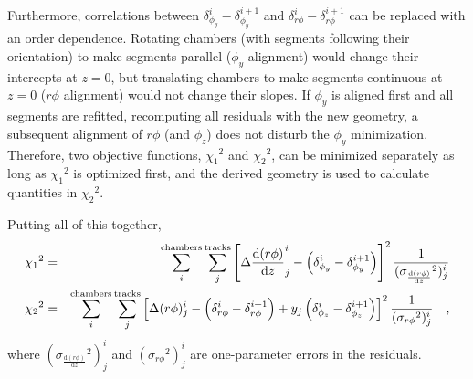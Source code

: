 Furthermore, correlations between $\delta_{\phi_y}^i
- \delta_{\phi_y}^{i+1}$ and $\delta_{r\phi}^i - \delta_{r\phi}^{i+1}$
can be replaced with an order dependence.  Rotating chambers (with
segments following their orientation) to make segments parallel
($\phi_y$ alignment) would change their intercepts at $z=0$,
but translating chambers to make segments continuous at $z=0$ ($r\phi$
alignment) would not change their slopes.  If
$\phi_y$ is aligned first and all segments are refitted, recomputing all residuals
with the new geometry, a subsequent alignment of $r\phi$ (and $\phi_z$) does not disturb
the $\phi_y$ minimization.  Therefore, two objective
functions, ${\chi_1}^2$ and ${\chi_2}^2$, can be minimized separately as long as
${\chi_1}^2$ is optimized first, and the derived geometry is used to calculate quantities in ${\chi_2}^2$.

Putting all of this together, 
\begin{eqnarray}
{\chi_1}^2 &=& \sum_i^{\mbox{\scriptsize chambers}} \sum_j^{\mbox{\scriptsize tracks}}
\left[ \Delta \frac{\textrm{d}(r\phi)}{\textrm{d}z}^i_j - \left(\delta_{\phi_y}^i
- \delta_{\phi_y}^{i+1}\right) \right]^2 \frac{1}{({\sigma_{\frac{\textrm{d}(r\phi)}{\textrm{d}z}}}^2)^i_j} \\
{\chi_2}^2 &=& \sum_i^{\mbox{\scriptsize chambers}} \sum_j^{\mbox{\scriptsize tracks}}
\left[ \Delta (r\phi)^i_j - \left(\delta_{r\phi}^i - \delta_{r\phi}^{i+1}\right)
+ y_j \left(\delta_{\phi_z}^i - \delta_{\phi_z}^{i+1}\right) \right]^2 \frac{1}{({\sigma_{r\phi}}^2)^i_j} \quad\mbox{,} \nonumber
\end{eqnarray}
where $({\sigma_{\frac{\textrm{d}(r\phi)}{\textrm{d}z}}}^2)^i_j$ and $({\sigma_{r\phi}}^2)^i_j$ are
one-parameter errors in the residuals.

